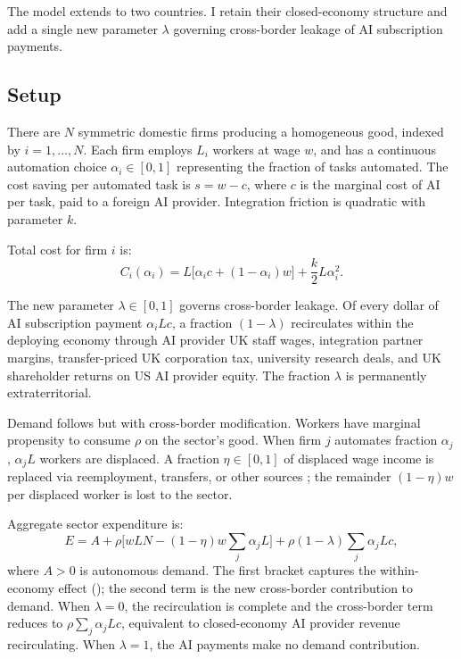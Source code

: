 \documentclass[11pt,letterpaper]{article}
\theoremstyle{remark}
\begin{document}
The model extends \citet{hemenway_falk_tsoukalas_2026} to two countries. I retain their closed-economy structure and add a single new parameter $\lambda$ governing cross-border leakage of {AI} subscription payments.

\subsection{Setup}

There are $N$ symmetric domestic firms producing a homogeneous good, indexed by $i = 1, \ldots, N$. Each firm employs $L_i$ workers at wage $w$, and has a continuous automation choice $\alpha_i \in [0, 1]$ representing the fraction of tasks automated. The cost saving per automated task is $s = w - c$, where $c$ is the marginal cost of {AI} per task, paid to a foreign {AI} provider. Integration friction is quadratic with parameter $k$.

Total cost for firm $i$ is:
\begin{equation}
C_i(\alpha_i) = L\big[\alpha_i c + (1 - \alpha_i)w\big] + \frac{k}{2} L \alpha_i^2.
\end{equation}

The new parameter $\lambda \in [0, 1]$ governs cross-border leakage. Of every dollar of {AI} subscription payment $\alpha_i L c$, a fraction $(1 - \lambda)$ recirculates within the deploying economy through {AI} provider {UK} staff wages, integration partner margins, transfer-priced {UK} corporation tax, university research deals, and {UK} shareholder returns on {US} {AI} provider equity. The fraction $\lambda$ is permanently extraterritorial.

Demand follows \citet{hemenway_falk_tsoukalas_2026} but with cross-border modification. Workers have marginal propensity to consume $\rho$ on the sector's good. When firm $j$ automates fraction $\alpha_j$, $\alpha_j L$ workers are displaced. A fraction $\eta \in [0, 1]$ of displaced wage income is replaced via reemployment, transfers, or other sources \citep{jacobson_lalonde_sullivan_1993}; the remainder $(1 - \eta) w$ per displaced worker is lost to the sector.

Aggregate sector expenditure is:
\begin{equation}
E = A + \rho \big[wLN - (1 - \eta) w \sum_j \alpha_j L\big] + \rho (1 - \lambda) \sum_j \alpha_j L c,
\end{equation}
where $A > 0$ is autonomous demand. The first bracket captures the within-economy effect (\citet{hemenway_falk_tsoukalas_2026}); the second term is the new cross-border contribution to demand. When $\lambda = 0$, the recirculation is complete and the cross-border term reduces to $\rho \sum_j \alpha_j L c$, equivalent to closed-economy {AI} provider revenue recirculating. When $\lambda = 1$, the {AI} payments make no demand contribution.
\end{document}
